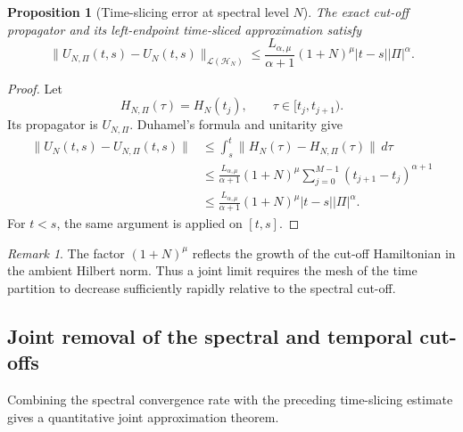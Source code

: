 \documentclass[11pt]{amsart}
\theoremstyle{plain}
\newtheorem{proposition}[theorem]{Proposition}
\theoremstyle{definition}
\theoremstyle{remark}
\newtheorem{remark}[theorem]{Remark}
\newcommand{\Hilb}{\mathcal H}
\begin{document}
\begin{proposition}[Time-slicing error at spectral level \(N\)]
\label{prop:uniform-time-slicing-error}
The exact cut-off propagator and its left-endpoint time-sliced approximation
satisfy
\[
 \|U_{N,\Pi}(t,s)-U_N(t,s)\|_{\mathcal L(\Hilb_N)}
 \leq
 \frac{L_{\alpha,\mu}}{\alpha+1}
 (1+N)^\mu |t-s| |\Pi|^\alpha.
\]
\end{proposition}

\begin{proof}
Let
\[
 H_{N,\Pi}(\tau)=H_N(t_j),
 \qquad \tau\in[t_j,t_{j+1}).
\]
Its propagator is \(U_{N,\Pi}\). Duhamel's formula and unitarity give
\[
\begin{aligned}
 \|U_N(t,s)-U_{N,\Pi}(t,s)\|
 &\leq
 \int_s^t\|H_N(\tau)-H_{N,\Pi}(\tau)\|\,d\tau \\
 &\leq
 \frac{L_{\alpha,\mu}}{\alpha+1}(1+N)^\mu
 \sum_{j=0}^{M-1}(t_{j+1}-t_j)^{\alpha+1} \\
 &\leq
 \frac{L_{\alpha,\mu}}{\alpha+1}(1+N)^\mu
 |t-s||\Pi|^\alpha.
\end{aligned}
\]
For \(t<s\), the same argument is applied on \([t,s]\).
\end{proof}

\begin{remark}
The factor \((1+N)^\mu\) reflects the growth of the cut-off Hamiltonian in
the ambient Hilbert norm. Thus a joint limit requires the mesh of the time
partition to decrease sufficiently rapidly relative to the spectral cut-off.
\end{remark}

\subsection{Joint removal of the spectral and temporal cut-offs}
\label{subsec:joint-removal-cutoffs}

Combining the spectral convergence rate with the preceding time-slicing
estimate gives a quantitative joint approximation theorem.
\end{document}

